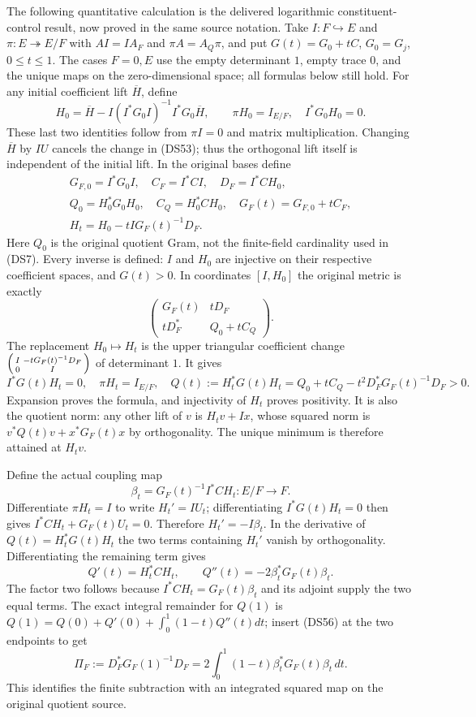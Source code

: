 \documentclass{article}
\begin{document}
The following quantitative calculation is the delivered logarithmic
constituent-control result, now proved in the same source notation.
Take $I:F\hookrightarrow E$ and $\pi:E\twoheadrightarrow E/F$
with $AI=IA_F$ and $\pi A=A_Q\pi$, and put
$G(t)=G_0+tC$, $G_0=G_j$, $0\leq t\leq1$.
The cases $F=0,E$ use the empty determinant $1$, empty trace $0$,
and the unique maps on the zero-dimensional space; all formulas
below still hold.  For any initial coefficient lift $\overline H$,
define
\[
 H_0=\overline H-I(I^*G_0I)^{-1}I^*G_0\overline H,
 \qquad \pi H_0=I_{E/F},\quad I^*G_0H_0=0.
 \tag{DS53}
\]
These last two identities follow from $\pi I=0$ and matrix
multiplication.  Changing $\overline H$ by $IU$ cancels the change
in (DS53); thus the orthogonal lift itself is independent of the
initial lift.  In the original bases define
\[
\begin{gathered}
 G_{F,0}=I^*G_0I,\quad C_F=I^*CI,\quad D_F=I^*CH_0,\\
 Q_0=H_0^*G_0H_0,\quad C_Q=H_0^*CH_0,
 \quad G_F(t)=G_{F,0}+tC_F,\\
 H_t=H_0-tIG_F(t)^{-1}D_F.
\end{gathered}\tag{DS54}
\]
Here $Q_0$ is the original quotient Gram, not the finite-field
cardinality used in (DS7).  Every inverse is defined: $I$ and $H_0$
are injective on their respective coefficient spaces, and $G(t)>0$.
In coordinates $[I,H_0]$ the original metric is exactly
\[
 \begin{pmatrix}G_F(t)&tD_F\\tD_F^*&Q_0+tC_Q\end{pmatrix}.
 \tag{DS55}
\]
The replacement $H_0\mapsto H_t$ is the upper triangular
coefficient change
$\begin{psmallmatrix}I&-tG_F(t)^{-1}D_F\\0&I\end{psmallmatrix}$
of determinant $1$.  It gives
\[
 I^*G(t)H_t=0,\quad \pi H_t=I_{E/F},\quad
 Q(t):=H_t^*G(t)H_t
 =Q_0+tC_Q-t^2D_F^*G_F(t)^{-1}D_F>0.
 \tag{DS56}
\]
Expansion proves the formula, and injectivity of $H_t$ proves
positivity.  It is also the quotient norm: any other lift of $v$
is $H_tv+Ix$, whose squared norm is
$v^*Q(t)v+x^*G_F(t)x$ by orthogonality.  The unique minimum is
therefore attained at $H_tv$.

Define the actual coupling map
\[
 \beta_t=G_F(t)^{-1}I^*CH_t:E/F\to F.
 \tag{DS57}
\]
Differentiate $\pi H_t=I$ to write $H_t'=IU_t$; differentiating
$I^*G(t)H_t=0$ then gives
$I^*CH_t+G_F(t)U_t=0$.  Therefore $H_t'=-I\beta_t$.
In the derivative of $Q(t)=H_t^*G(t)H_t$ the two terms containing
$H_t'$ vanish by orthogonality.  Differentiating the remaining term
gives
\[
 Q'(t)=H_t^*CH_t,\qquad
 Q''(t)=-2\beta_t^*G_F(t)\beta_t.
 \tag{DS58}
\]
The factor two follows because
$I^*CH_t=G_F(t)\beta_t$ and its adjoint supply the two equal
terms.  The exact integral remainder for $Q(1)$ is
$Q(1)=Q(0)+Q'(0)+\int_0^1(1-t)Q''(t)dt$; insert (DS56) at the
two endpoints to get
\[
 \Pi_F:=D_F^*G_F(1)^{-1}D_F
 =2\int_0^1(1-t)\beta_t^*G_F(t)\beta_t\,dt.
 \tag{DS59}
\]
This identifies the finite subtraction with an integrated squared
map on the original quotient source.
\end{document}
